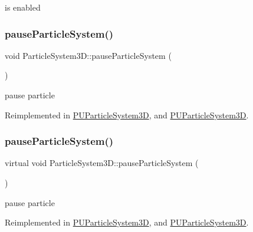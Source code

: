 is enabled \mbox{\label{classParticleSystem3D_ade8abd1ad8b534b6c8485aa43ed8c78e}} 
\subsubsection{\texorpdfstring{pause\+Particle\+System()}{pauseParticleSystem()}\hspace{0.1cm}{\footnotesize\ttfamily [1/2]}}
{\footnotesize\ttfamily void Particle\+System3\+D\+::pause\+Particle\+System (\begin{DoxyParamCaption}{ }\end{DoxyParamCaption})\hspace{0.3cm}{\ttfamily [virtual]}}

pause particle 

Reimplemented in \hyperlink{classPUParticleSystem3D_a646df19f678e37df2d1793d7f9a970a2}{P\+U\+Particle\+System3D}, and \hyperlink{classPUParticleSystem3D_aff7cc367d4a38e89a3935e6a3b5a482f}{P\+U\+Particle\+System3D}.

\mbox{\label{classParticleSystem3D_ac1e89d8e8e1d6203580a883a9cb665bf}} 
\subsubsection{\texorpdfstring{pause\+Particle\+System()}{pauseParticleSystem()}\hspace{0.1cm}{\footnotesize\ttfamily [2/2]}}
{\footnotesize\ttfamily virtual void Particle\+System3\+D\+::pause\+Particle\+System (\begin{DoxyParamCaption}{ }\end{DoxyParamCaption})\hspace{0.3cm}{\ttfamily [virtual]}}

pause particle 

Reimplemented in \hyperlink{classPUParticleSystem3D_a646df19f678e37df2d1793d7f9a970a2}{P\+U\+Particle\+System3D}, and \hyperlink{classPUParticleSystem3D_aff7cc367d4a38e89a3935e6a3b5a482f}{P\+U\+Particle\+System3D}.

